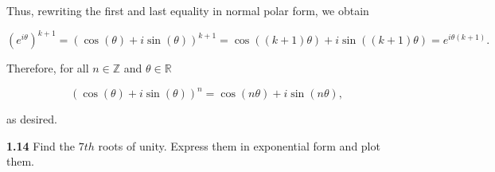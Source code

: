\documentclass[12pt, a4paper]{article}
\begin{document}
\begin{description}
\begin{description}
        \item Thus, rewriting the first and last equality in normal polar form, we obtain
        
        \begin{equation*}
            (e^{i\theta})^{k+1}=(\cos(\theta)+i\sin(\theta))^{k+1}=\cos((k+1)\theta)+i\sin((k+1)\theta)=e^{i\theta(k+1)}.
        \end{equation*}
        
        \vspace{2mm}
        
        \item Therefore, for all $n\in\mathbb{Z}$ and $\theta\in\mathbb{R}$
        
        \begin{equation*}
            (\cos(\theta)+i\sin(\theta))^n = \cos(n\theta)+i\sin(n\theta),
        \end{equation*}
        
        \item as desired.
        
    \end{description}    
\end{description}

\newpage

\noindent\textbf{1.14} Find the $7th$ roots of unity. Express them in exponential form and plot them.

\vspace{4mm}
\end{document}
